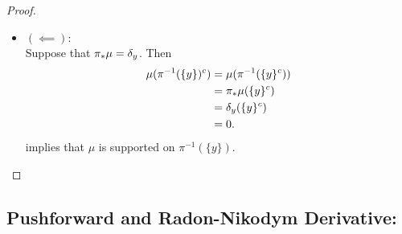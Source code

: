\documentclass{book}
\begin{document}
\begin{proof}
\begin{itemize}
			Since $B \in \MB$ is arbitrary, we have that for each $B \in \MB$, 
			\begin{align*}
				\pi_*\mu(B)
				& = 
				\begin{cases}
					1, & y \in B \\
					0, & y \not \in B
				\end{cases} \\
				& = \del_y(B).
			\end{align*}
			Hence $\pi_*\mu = \del_y$.
			\item $(\impliedby)$: \\
			Suppose that $\pi_*\mu = \del_y$. Then 
			\begin{align*}
				\mu(\pi^{-1}(\{y\})^c) 
				& = \mu(\pi^{-1}(\{y\}^c)) \\
				& = \pi_* \mu(\{y\}^c) \\
				& = \delta_y(\{y\}^c) \\
				& = 0.  
			\end{align*}
			 implies that $\mu$ is supported on $\pi^{-1}(\{y\})$.
		\end{itemize}
	\end{proof}






















































	\subsection{Pushforward and Radon-Nikodym Derivative:}
	
\end{document}
